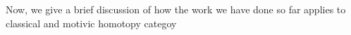 \documentclass[../main.tex]{subfiles}
\begin{document}
Now, we give a brief discussion of how the work we have done so far applies to classical and motivic homotopy categoy
\end{document}
